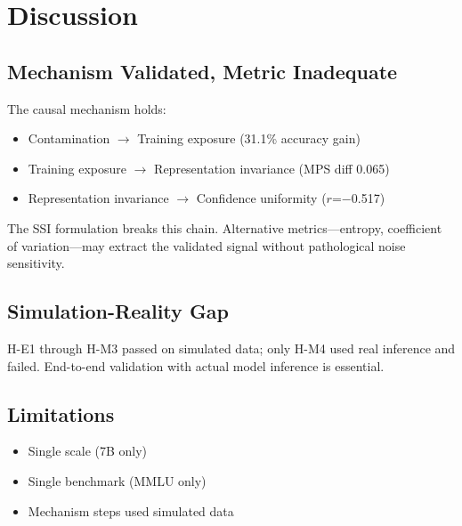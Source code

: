 \section{Discussion}

\subsection{Mechanism Validated, Metric Inadequate}

The causal mechanism holds:
\begin{itemize}
    \item Contamination $\rightarrow$ Training exposure (31.1\% accuracy gain)
    \item Training exposure $\rightarrow$ Representation invariance (MPS diff 0.065)
    \item Representation invariance $\rightarrow$ Confidence uniformity ($r$=$-$0.517)
\end{itemize}

The SSI formulation breaks this chain. Alternative metrics---entropy, coefficient of variation---may extract the validated signal without pathological noise sensitivity.

\subsection{Simulation-Reality Gap}

H-E1 through H-M3 passed on simulated data; only H-M4 used real inference and failed. End-to-end validation with actual model inference is essential.

\subsection{Limitations}

\begin{itemize}
    \item Single scale (7B only)
    \item Single benchmark (MMLU only)
    \item Mechanism steps used simulated data
\end{itemize}
